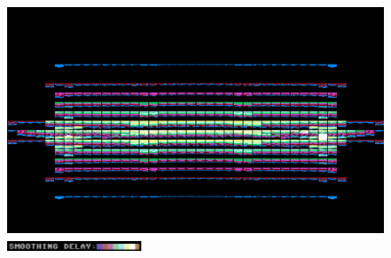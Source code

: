 \begin{figure}[H]
    \centering
    \begin{adjustbox}{width=10.5cm,margin=0cm}
      \includegraphics[width=12cm]{src/delay/pixelhist-1.png}%
    \end{adjustbox}
    \caption{
      \includegraphics[width=4cm]{src/delay/delay-high.png}%
      }
\end{figure}
